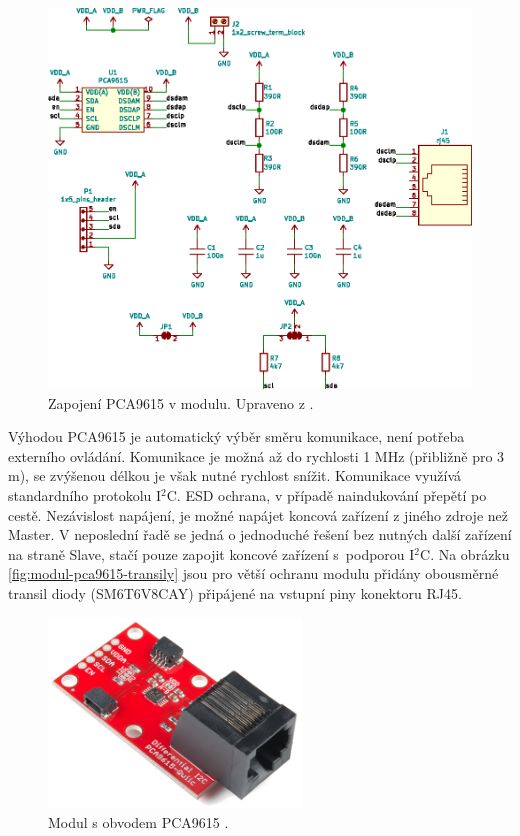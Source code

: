 \begin{figure}[H]
    \centering
    \includegraphics[width=\textwidth]{images/svg/kicad/zapojeni-pca9615-i2c-sbernice.eps}
    \caption[Zapojení PCA9615 v modulu.]{Zapojení PCA9615 v modulu. Upraveno z \cite{pca9615-schema-zapojeni}.}
    \label{fig:zapojeni-pca9615-i2c-sbernice}
\end{figure}

Výhodou PCA9615 je automatický výběr směru komunikace, není potřeba externího ovládání. Komunikace je možná až do rychlosti 1 MHz (přibližně pro 3 m), se zvýšenou délkou je však nutné rychlost snížit. Komunikace využívá standardního protokolu I$^2$C. ESD ochrana, v případě naindukování přepětí po cestě. Nezávislost napájení, je možné napájet koncová zařízení z jiného zdroje než Master. V neposlední řadě se jedná o jednoduché řešení bez nutných další zařízení na straně Slave, stačí pouze zapojit koncové zařízení s~podporou I$^2$C. Na obrázku \ref{fig:modul-pca9615-transily} jsou pro větší ochranu modulu přidány obousměrné transil diody (SM6T6V8CAY) připájené na vstupní piny konektoru RJ45.

\begin{figure}[H]
    \centering
    \includegraphics[width=0.6\textwidth]{images/modul-pca9615/modul-pca9615-i2c-sbernice.png}
    \caption[Modul s obvodem PCA9615.]{Modul s obvodem PCA9615 \cite{pca9615-i2c-modul}.}
    \label{fig:modul-pca9615-i2c-sbernice}
\end{figure}

